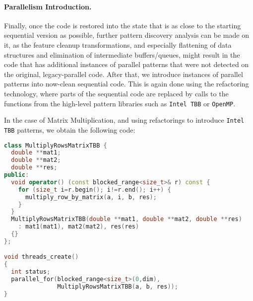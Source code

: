 \documentclass{llncs}
\begin{document}
   \paragraph{Parallelism Introduction.}
    Finally, once the code is restored into the state that is as close to the starting sequential version as possible, further pattern discovery analysis can be made on it, as the feature cleanup transformations, and especially flattening of data structures and elimination of intermediate buffers/queues, might result in the code that has additional instances of parallel patterns that were not detected on the original, legacy-parallel code. After that, we introduce instances of parallel patterns into now-clean sequential code. This is again done using the refactoring technology, where parts of the sequential code are replaced by calls to the functions from the high-level pattern libraries such as \lstinline{Intel TBB} or \lstinline{OpenMP}. 
    
    In the case of Matrix Multiplication, and using refactorings to introduce \lstinline{Intel TBB} patterns, we obtain the following code:
 
 \begin{lstlisting}[linewidth=\columnwidth,language=C++,basicstyle=\tiny]
 class MultiplyRowsMatrixTBB {
  double **mat1;
  double **mat2;
  double **res;
public:
  void operator() (const blocked_range<size_t>& r) const {
    for (size_t i=r.begin(); i!=r.end(); i++) {
      multiply_row_by_matrix(a, i, b, res);
    }
  }
  MultiplyRowsMatrixTBB(double **mat1, double **mat2, double **res)
    : mat1(mat1), mat2(mat2), res(res)
  {}
};

void threads_create()
{
  int status;
  parallel_for(blocked_range<size_t>(0,dim), 
               MultiplyRowsMatrixTBB(a, b, res));
}
\end{lstlisting}
    
    



\end{document}

